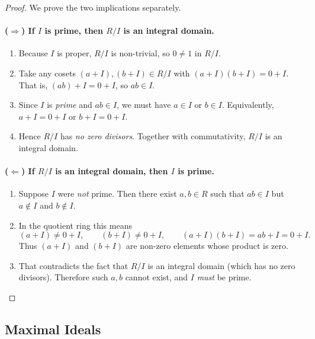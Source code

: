 \documentclass[12pt]{article}
\theoremstyle{definition} %
\theoremstyle{plain} %
\begin{document}
\begin{proof}
  We prove the two implications separately.

  \paragraph{(\(\Longrightarrow\)) If \(I\) is prime, then \(R/I\) is an integral domain.}
  \begin{enumerate}
    \item Because \(I\) is proper, \(R/I\) is non-trivial, so \(0\neq 1\) in \(R/I\).
    \item Take any cosets \((a+I),(b+I)\in R/I\) with \((a+I)(b+I)=0+I\).  
          That is, \((ab)+I = 0+I\), so \(ab\in I\).
    \item Since \(I\) is \emph{prime} and \(ab\in I\), we must have \(a\in I\) or \(b\in I\).
          Equivalently, \(a+I=0+I\) or \(b+I=0+I\).
    \item Hence \(R/I\) has \emph{no zero divisors}.  
          Together with commutativity, \(R/I\) is an integral domain.
  \end{enumerate}

  \paragraph{(\(\Longleftarrow\)) If \(R/I\) is an integral domain, then \(I\) is prime.}
  \begin{enumerate}
    \item Suppose \(I\) were \emph{not} prime.  
          Then there exist \(a,b\in R\) such that \(ab\in I\) but \(a\notin I\) and \(b\notin I\).
    \item In the quotient ring this means
          \[
            (a+I)\neq 0+I,\qquad (b+I)\neq 0+I,\qquad
            (a+I)(b+I)=ab+I = 0+I .
          \]
          Thus \((a+I)\) and \((b+I)\) are non-zero elements whose product is zero.
    \item That contradicts the fact that \(R/I\) is an integral domain (which has no zero divisors).
          Therefore such \(a,b\) cannot exist, and \(I\) \emph{must} be prime.
  \end{enumerate}
\end{proof}
\subsection*{Maximal Ideals}
\end{document}
